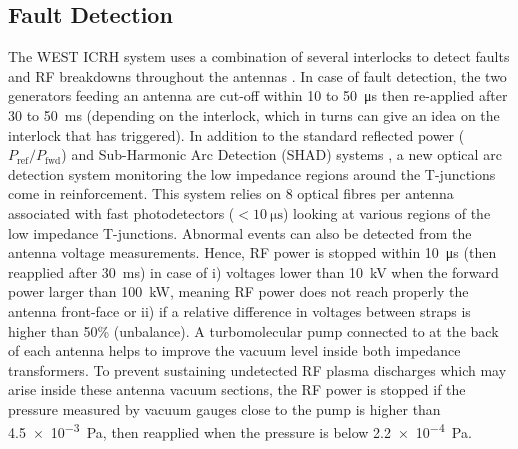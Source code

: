 \documentclass[12p]{iopart}
\begin{document}
\subsection{Fault Detection}
The WEST ICRH system uses a combination of several interlocks to detect faults and RF breakdowns throughout the antennas \cite{hillairet2015-2, helou2020}. In case of fault detection, the two generators feeding an antenna are cut-off within 10 to \SI{50}{\micro\second} then re-applied after 30 to \SI{50}{\milli\second} (depending on the interlock, which in turns can give an idea on the interlock that has triggered). In addition to the standard reflected power ($P_{\mathrm{ref}}/P_{\mathrm{fwd}}$) and Sub-Harmonic Arc Detection (SHAD) systems \cite{berger-by2007}, a new optical arc detection system monitoring the low impedance regions around the T-junctions come in reinforcement. This system relies on 8 optical fibres per antenna associated with fast photodetectors ($<\SI{10}{\micro\second}$) looking at various regions of the low impedance T-junctions. Abnormal events can also be detected from the antenna voltage measurements. Hence, RF power is stopped within \SI{10}{\micro\second} (then reapplied after \SI{30}{\milli\second}) in case of i) voltages lower than \SI{10}{\kilo\volt} when the forward power larger than \SI{100}{\kilo\watt}, meaning RF power does not reach properly the antenna front-face or ii) if a relative difference in voltages between straps is higher than 50\% (unbalance). A  turbomolecular pump connected to at the back of each antenna helps to improve the vacuum level inside both impedance transformers. To prevent sustaining undetected RF plasma discharges which may arise inside these antenna vacuum sections, the RF power is stopped if the pressure measured by vacuum gauges close to the pump is higher than \SI{4.5e-3}{\pascal}, then reapplied when the pressure is below \SI{2.2e-4}{\pascal}.
\end{document}
